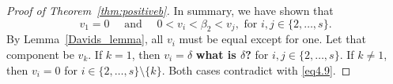 \begin{proof}[Proof of Theorem~\ref{thm:positiveb}]
    In summary, we have shown that
    \begin{equation}\label{eq4.9}
        v_{1} = 0 \quad \text{ and } \quad 0 < v_{i} < \beta_{2} < v_{j}, \text{ for } i,j \in \{2,\dots,s\}.
    \end{equation}
    By Lemma~\ref{Davids_lemma}, all \( v_{i} \) must be equal except for one.
    Let that component be \( v_{k} \). If \( k = 1 \), then \( v_{i} = \delta
    \) {\bf what is $\delta$?} for \( i,j \in \{2,\dots,s\} \). If \( k \neq 1
    \), then \( v_{i} = 0 \) for \( i \in \{2,\dots,s\}\setminus\{k\} \). Both
    cases contradict with \eqref{eq4.9}. %

\end{proof}
